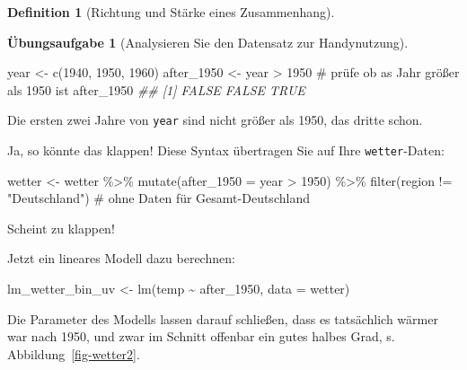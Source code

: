 \documentclass[
  a4paper,
  DIV=11]{scrreprt}
\newenvironment{Shaded}{\begin{snugshade}}{\end{snugshade}}
\newcommand{\AttributeTok}[1]{\textcolor[rgb]{0.40,0.45,0.13}{#1}}
\newcommand{\CommentTok}[1]{\textcolor[rgb]{0.37,0.37,0.37}{#1}}
\newcommand{\DecValTok}[1]{\textcolor[rgb]{0.68,0.00,0.00}{#1}}
\newcommand{\DocumentationTok}[1]{\textcolor[rgb]{0.37,0.37,0.37}{\textit{#1}}}
\newcommand{\FunctionTok}[1]{\textcolor[rgb]{0.28,0.35,0.67}{#1}}
\newcommand{\NormalTok}[1]{\textcolor[rgb]{0.00,0.23,0.31}{#1}}
\newcommand{\OtherTok}[1]{\textcolor[rgb]{0.00,0.23,0.31}{#1}}
\newcommand{\SpecialCharTok}[1]{\textcolor[rgb]{0.37,0.37,0.37}{#1}}
\newcommand{\StringTok}[1]{\textcolor[rgb]{0.13,0.47,0.30}{#1}}
\theoremstyle{definition}
\newtheorem{exercise}{Übungsaufgabe}[chapter]
\theoremstyle{definition}
\theoremstyle{definition}
\newtheorem{definition}{Definition}[chapter]
\theoremstyle{remark}
\begin{document}
\begin{definition}[Richtung und Stärke eines
Zusammenhang]
\begin{exercise}[Analysieren Sie den Datensatz zur
Handynutzung]
\begin{Shaded}
\begin{Highlighting}[]
\NormalTok{year }\OtherTok{\textless{}{-}} \FunctionTok{c}\NormalTok{(}\DecValTok{1940}\NormalTok{, }\DecValTok{1950}\NormalTok{, }\DecValTok{1960}\NormalTok{)}
\NormalTok{after\_1950 }\OtherTok{\textless{}{-}}\NormalTok{ year }\SpecialCharTok{\textgreater{}} \DecValTok{1950}  \CommentTok{\# prüfe ob as Jahr größer als 1950 ist}
\NormalTok{after\_1950}
\DocumentationTok{\#\# [1] FALSE FALSE  TRUE}
\end{Highlighting}
\end{Shaded}

Die ersten zwei Jahre von \texttt{year} sind nicht größer als 1950, das
dritte schon.

Ja, so könnte das klappen! Diese Syntax übertragen Sie auf Ihre
\texttt{wetter}-Daten:

\begin{Shaded}
\begin{Highlighting}[]
\NormalTok{wetter }\OtherTok{\textless{}{-}}
\NormalTok{  wetter }\SpecialCharTok{\%\textgreater{}\%} 
  \FunctionTok{mutate}\NormalTok{(}\AttributeTok{after\_1950 =}\NormalTok{ year }\SpecialCharTok{\textgreater{}} \DecValTok{1950}\NormalTok{) }\SpecialCharTok{\%\textgreater{}\%} 
  \FunctionTok{filter}\NormalTok{(region }\SpecialCharTok{!=} \StringTok{"Deutschland"}\NormalTok{)  }\CommentTok{\# ohne Daten für Gesamt{-}Deutschland}
\end{Highlighting}
\end{Shaded}

Scheint zu klappen!

Jetzt ein lineares Modell dazu berechnen:

\begin{Shaded}
\begin{Highlighting}[]
\NormalTok{lm\_wetter\_bin\_uv }\OtherTok{\textless{}{-}} \FunctionTok{lm}\NormalTok{(temp }\SpecialCharTok{\textasciitilde{}}\NormalTok{ after\_1950, }\AttributeTok{data =}\NormalTok{ wetter)}
\end{Highlighting}
\end{Shaded}

Die Parameter des Modells lassen darauf schließen, dass es tatsächlich
wärmer war nach 1950, und zwar im Schnitt offenbar ein gutes halbes
Grad, s. Abbildung~\ref{fig-wetter2}.

\begin{figure}

\begin{minipage}{0.50\linewidth}


\end{minipage}
\end{figure}
\end{exercise}
\end{definition}
\end{document}
